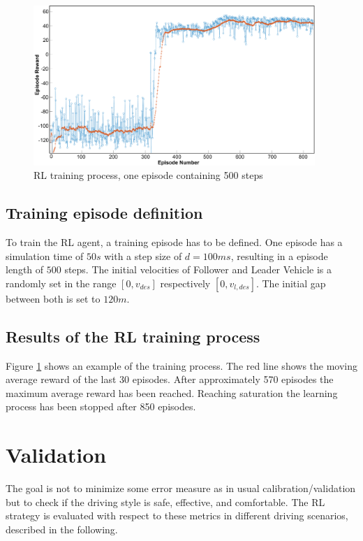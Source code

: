 \documentclass[review]{elsarticle}
\begin{document}
\begin{figure}
	\centering
	\includegraphics[width=0.95\textwidth]{images/Training}
	\caption{RL training process, one episode containing 500 steps}
	\label{fig:training}
\end{figure}

\subsection{Training episode definition}

To train the RL agent, a training episode has to be defined. One episode has a simulation time of $50s$ with a step size of $d=100ms$, resulting in a episode length of $500$ steps. The initial velocities of Follower and Leader Vehicle is a randomly set in the range $[0,v_{des}]$ respectively  $[0,v_{l,des}]$. The initial gap between both is set to $120m$. 

\subsection{Results of the RL training process}

Figure \ref{fig:training} shows an example of the training process. The red line shows the moving average reward of the last 30 episodes. After approximately 570 episodes the maximum average reward has been reached. Reaching saturation the learning process has been stopped after 850 episodes. 

\section{Validation}

The goal is not to minimize some error measure as in usual
calibration/validation but to check if the driving style is safe,
effective, and comfortable. The RL strategy is evaluated with respect to these metrics in different driving scenarios, described in the following.
\end{document}
